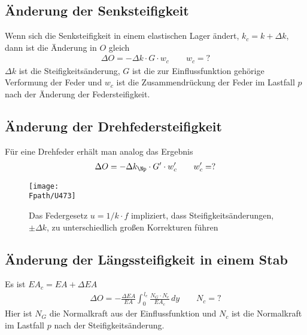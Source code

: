{{{{{{%
\textcolor{blau2}{\subsection{\"{A}nderung der Senksteifigkeit}}
Wenn sich die Senksteifigkeit  in einem elastischen Lager \"{a}ndert, $k_c = k + \Delta k$, dann ist die \"{A}nderung in $O$ gleich
\begin{align}
\Delta O = - \Delta k \cdot G \cdot w_c \qquad w_c = ?
\end{align}
$\Delta k$ ist die Steifigkeits\"{a}nderung, $G$ ist die zur  Einflussfunktion geh\"{o}rige Verformung der Feder und $w_c$ ist die Zusammendr\"{u}ckung der Feder im Lastfall $p$ nach der \"{A}nderung der Federsteifigkeit.

\textcolor{blau2}{\subsection{\"{A}nderung der Drehfedersteifigkeit }}
F\"{u}r eine Drehfeder erh\"{a}lt man analog das Ergebnis
\begin{align}
\Delta O = -\Delta k_\Np \cdot G' \cdot w_c' \qquad w_c' = ?
\end{align}
\begin{figure}[tbp]
\centering
\texttt{[image: \\Fpath/U473]}
\caption{Das Federgesetz $u = 1/k \cdot f$ impliziert, dass Steifigkeits\"{a}nderungen, $\pm \Delta k$, zu unterschiedlich gro{\ss}en Korrekturen f\"{u}hren}
\label{U473}
\end{figure}%

\textcolor{blau2}{\subsection{\"{A}nderung der L\"{a}ngssteifigkeit in einem Stab}}
Es ist $EA_c = EA + \Delta EA$
\begin{align}
\Delta O = - \frac{\Delta EA}{EA} \int_0^{\,l_e} \frac{N_G \cdot N_c}{EA_c}\,dy \qquad N_c = ?
\end{align}
Hier ist $N_G$ die Normalkraft aus der Einflussfunktion und $N_c$ ist die Normalkraft im Lastfall $p$ nach der Steifigkeits\"{a}nderung.

}}}}}}
